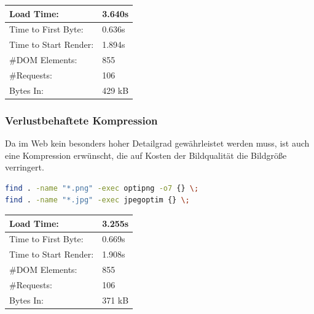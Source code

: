 \begin{table}
\caption{Ergebnis der verlustfreien Kompression der Bilder}
    \begin{longtable}{ | p{3cm} | p{1.5cm} | }
    \hline
    Load Time: 			& 3.640s 	\\ \hline
    Time to First Byte:		& 0.636s  	\\ \hline
    Time to Start Render:	& 1.894s	\\ \hline
    \#DOM Elements:		& 855 		\\ \hline
    \#Requests:			& 106 		\\ \hline
    Bytes In:			& 429 kB 	\\ \hline
    \hline
    \end{longtable}
\end{table}

\subsubsection{Verlustbehaftete Kompression}
Da im Web kein besonders hoher Detailgrad gewährleistet werden muss, ist auch eine Kompression erwünscht, die auf Kosten der Bildqualität die Bildgröße verringert. 

\begin{minipage}[t]{1\textwidth}
\begin{lstlisting}[language=bash,label=verlustbehaftets Optimieren mit find,caption= verlustbehaftetes Optimieren mit find]
find . -name "*.png" -exec optipng -o7 {} \;
find . -name "*.jpg" -exec jpegoptim {} \;
\end{lstlisting}
\end{minipage}

\begin{table}
\caption{Ergebnis der verlustbehafteten Kompression der Bilder}
    \begin{longtable}{ | p{3cm} | p{1.5cm} | }
    \hline
    Load Time: 			& 3.255s 	\\ \hline
    Time to First Byte:		& 0.669s  	\\ \hline
    Time to Start Render:	& 1.908s	\\ \hline
    \#DOM Elements:		& 855 		\\ \hline
    \#Requests:			& 106 		\\ \hline
    Bytes In:			& 371 kB 	\\ \hline
    \hline
    \end{longtable}
\end{table}


